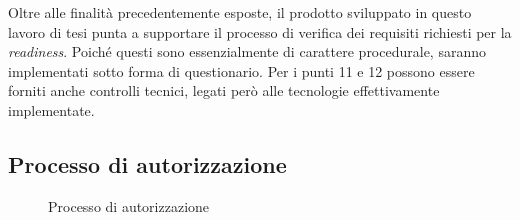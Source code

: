 \documentclass[../main.tex]{subfiles}
\begin{document}
Oltre alle finalità precedentemente esposte, il prodotto sviluppato in questo lavoro di tesi punta a supportare il processo di verifica dei requisiti richiesti per la \textit{readiness}. Poiché questi sono essenzialmente di carattere procedurale, saranno implementati sotto forma di questionario.
Per i punti 11 e 12 possono essere forniti anche controlli tecnici, legati però alle tecnologie effettivamente implementate.

\subsection {Processo di autorizzazione}
\begin{figure}[H]
\centering
{}
\caption{Processo di autorizzazione \cite{understandingFedRAMP} }\label{fig:fedrampactors}
\end{figure}
\end{document}
